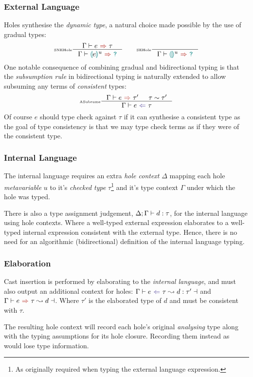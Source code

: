 \subsubsection{External Language}\label{sec:HazelExternalLang}
Holes synthesise the \textit{dynamic type}, a natural choice made possible by the use of gradual types:
\[\inference[\tiny SNEHole]{\synthesis{e}{\tau}}{\synthesis{\hole[e]^u}{\dyn}} \qquad \inference[\tiny SEHole]{}{\synthesis{\hole^u}{\dyn}}\] 
One notable consequence of combining gradual and bidirectional typing is that the \textit{subsumption rule} in bidirectional typing is naturally extended to allow subsuming any terms of \textit{consistent} types:
\[\inference[\tiny ASubsume]{\synthesis{e}{\tau'}& \tau \sim \tau'}{\analysis{e}{\tau}}\]
Of course $e$ should type check against $\tau$ if it can synthesise a consistent type as the goal of type consistency is that we may type check terms as if they were of the consistent type.

\subsubsection{Internal Language}\label{sec:HazelInternalLang}
The internal language requires an extra \textit{hole context} $\Delta$ mapping each hole \textit{metavariable} $u$ to it's \textit{checked type} $\tau$\footnote{As originally required when typing the external language expression.} and it's type context $\Gamma$ under which the hole was typed.

There is also a type assignment judgement, $\Delta;\Gamma \vdash d : \tau$, for the internal language using hole contexts. Where a well-typed external expression elaborates to a well-typed internal expression consistent with the external type. Hence, there is no need for an algorithmic (bidirectional) definition of the internal language typing.

\subsubsection{Elaboration}\label{sec:HazelElaboration}
Cast insertion is performed by elaborating to the \textit{internal language}, and must also output an additional context for holes: $\elaborationAnalysis{e}{\tau}{d}{\tau'}$ and $\elaborationSynthesis{e}{\tau}{d}$. Where $\tau'$ is the elaborated type of $d$ and must be consistent with $\tau$. 

The resulting hole context will record each hole's original \textit{analysing} type along with the typing assumptions for its hole closure. Recording them instead as {\dyn} would lose type information.

